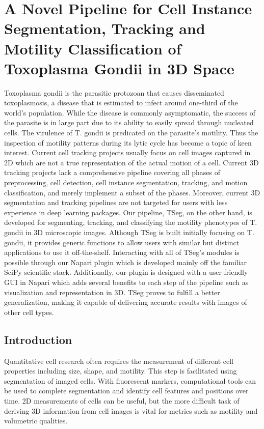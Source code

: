 \documentclass[./dissertation.tex]{subfiles}
\begin{document}
\chapter{A Novel Pipeline for Cell Instance Segmentation, Tracking and Motility Classification of Toxoplasma Gondii in 3D Space}

Toxoplasma gondii is the parasitic protozoan that causes disseminated toxoplasmosis, a disease that is estimated to infect around one-third of the world's population. While the disease is commonly asymptomatic, the success of the parasite is in large part due to its ability to easily spread through nucleated cells. The virulence of T. gondii is predicated on the parasite's motility. Thus the inspection of motility patterns during its lytic cycle has become a topic of keen interest. Current cell tracking projects usually focus on cell images captured in 2D which are not a true representation of the actual motion of a cell. Current 3D tracking projects lack a comprehensive pipeline covering all phases of preprocessing, cell detection, cell instance segmentation, tracking, and motion classification, and merely implement a subset of the phases. Moreover, current 3D segmentation and tracking pipelines are not targeted for users with less experience in deep learning packages. Our pipeline, TSeg, on the other hand, is developed for segmenting, tracking, and classifying the motility phenotypes of T. gondii in 3D microscopic images. Although TSeg is built initially focusing on T. gondii, it provides generic functions to allow users with similar but distinct applications to use it off-the-shelf. Interacting with all of TSeg's modules is possible through our Napari plugin which is developed mainly off the familiar SciPy scientific stack. Additionally, our plugin is designed with a user-friendly GUI in Napari which adds several benefits to each step of the pipeline such as visualization and representation in 3D. TSeg proves to fulfill a better generalization, making it capable of delivering accurate results with images of other cell types.

\section{Introduction}
Quantitative cell research often requires the measurement of different cell properties including size, shape, and motility. This step is facilitated using segmentation of imaged cells. With fluorescent markers, computational tools can be used to complete segmentation and identify cell features and positions over time. 2D measurements of cells can be useful, but the more difficult task of deriving 3D information from cell images is vital for metrics such as motility and volumetric qualities.
\end{document}
